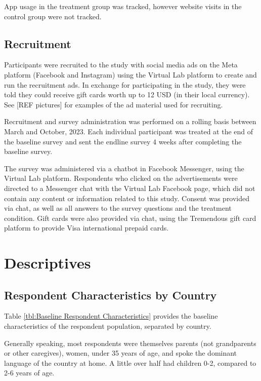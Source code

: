 \documentclass{article}
\begin{document}
App usage in the treatment group was tracked, however website visits in the control group were not tracked.

\subsection*{Recruitment}

Participants were recruited to the study with social media ads on the Meta platform (Facebook and Instagram) using the Virtual Lab platform to create and run the recruitment ads. In exchange for participating in the study, they were told they could receive gift cards worth up to 12 USD (in their local currency). See [REF pictures] for examples of the ad material used for recruiting.

Recruitment and survey administration was performed on a rolling basis between March and October, 2023. Each individual participant was treated at the end of the baseline survey and sent the endline survey 4 weeks after completing the baseline survey.

The survey was administered via a chatbot in Facebook Messenger, using the Virtual Lab platform. Respondents who clicked on the advertisements were directed to a Messenger chat with the Virtual Lab Facebook page, which did not contain any content or information related to this study. Consent was provided via chat, as well as all answers to the survey questions and the treatment condition. Gift cards were also provided via chat, using the Tremendous gift card platform to provide Visa international prepaid cards.


\section{Descriptives}


\subsection*{Respondent Characteristics by Country}

Table \ref{tbl:Baseline Respondent Characteristics} provides the baseline characteristics of the respondent population, separated by country.

Generally speaking, most respondents were themselves parents (not grandparents or other caregives), women, under 35 years of age, and spoke the dominant language of the country at home. A little over half had children 0-2, compared to 2-6 years of age.
\end{document}
